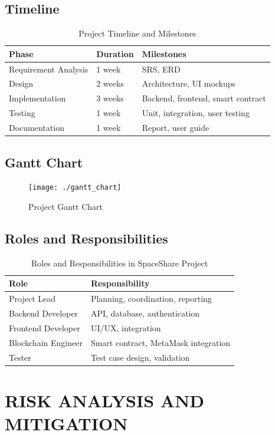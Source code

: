 \documentclass[a4paper, 12pt]{report}
\newenvironment{frontmatter}{}{}
\begin{document}
\begin{frontmatter}
\section{Timeline}
\begin{longtable}{|l|l|l|}
\caption{Project Timeline and Milestones} \\
\hline
\textbf{Phase} & \textbf{Duration} & \textbf{Milestones} \\
\hline
Requirement Analysis & 1 week & SRS, ERD \\
\hline
Design & 2 weeks & Architecture, UI mockups \\
\hline
Implementation & 3 weeks & Backend, frontend, smart contract \\
\hline
Testing & 1 week & Unit, integration, user testing \\
\hline
Documentation & 1 week & Report, user guide \\
\hline
\end{longtable}

\section{Gantt Chart}
\begin{figure}[H]
    \centering
    \texttt{[image: ./gantt\_chart]}
    \caption{Project Gantt Chart}
\end{figure}

\section{Roles and Responsibilities}
\begin{longtable}{|l|l|}
\caption{Roles and Responsibilities in SpaceShare Project} \\
\hline
\textbf{Role} & \textbf{Responsibility} \\
\hline
Project Lead & Planning, coordination, reporting \\
\hline
Backend Developer & API, database, authentication \\
\hline
Frontend Developer & UI/UX, integration \\
\hline
Blockchain Engineer & Smart contract, MetaMask integration \\
\hline
Tester & Test case design, validation \\
\hline
\end{longtable}

\chapter{RISK ANALYSIS AND MITIGATION}

\end{frontmatter}
\end{document}
